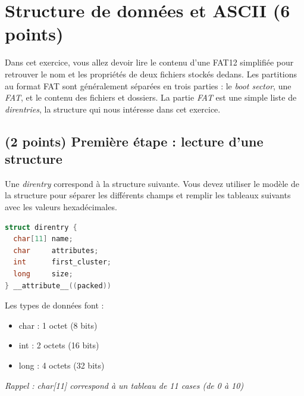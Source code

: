 \documentclass[11pt,a4paper]{article}
\begin{document}



\section{Structure de données et ASCII (6 points)}

\noindent Dans cet exercice, vous allez devoir lire le contenu d'une FAT12 simplifiée pour retrouver le nom et les propriétés de deux fichiers stockés dedans.
Les partitions au format FAT sont généralement séparées en trois parties : le \textit{boot sector}, une \textit{FAT}, et le contenu des fichiers et dossiers.
La partie \textit{FAT} est une simple liste de \textit{direntries}, la structure qui nous intéresse dans cet exercice.

\medskip

\subsection{(2 points) Première étape : lecture d'une structure }

\noindent Une \textit{direntry} correspond à la structure suivante.
Vous devez utiliser le modèle de la structure pour séparer les différents champs et remplir les tableaux suivants avec les valeurs hexadécimales.

\begin{table}[ht!]
  \centering
  \begin{minipage}{0.45\textwidth}
    \centering
\begin{lstlisting}[language=C]
struct direntry {
  char[11] name;
  char     attributes;
  int      first_cluster;
  long     size;
} __attribute__((packed)) \end{lstlisting}
  \end{minipage}
  \hfillx
  \begin{minipage}{0.45\textwidth}
Les types de données font :

\begin{itemize}
\item char : 1 octet (8 bits)
\item int : 2 octets (16 bits)
\item long : 4 octets (32 bits)
\end{itemize}

\textit{Rappel : char[11] correspond à un tableau de 11 cases (de 0 à 10)}
  \end{minipage}
\end{table}
\end{document}
